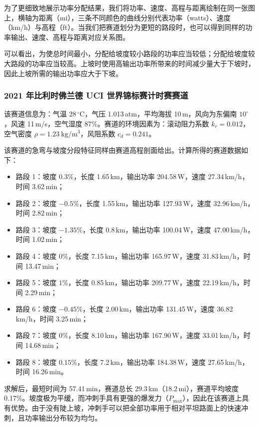 \documentclass[11pt,a4paper]{ctexart}
\begin{document}
为了更细致地展示功率分配结果，我们将功率、速度、高程与距离绘制在同一张图上，横轴为距离（mi），三条不同颜色的曲线分别代表功率（watts）、速度（km/h）与高程（ft）。当我们把赛道划分为更短的路段时，也可以得到同样的功率输出、速度、高程与距离对应关系图。

可以看出，为使总时间最小，分配给坡度较小路段的功率应当较低；分配给坡度较大路段的功率应当较高。上坡时使用高输出功率所带来的时间减少量大于下坡时，因此上坡所需的输出功率应大于下坡。

\subsubsection{2021 年比利时佛兰德 UCI 世界锦标赛计时赛赛道}

该赛道信息为：气温 $28\,^{\circ}\mathrm{C}$，气压 1.013\,atm，平均海拔 10\,m，风向为东偏南 $10^{\circ}$，风速 11\,m/s，空气湿度 87\%。赛道的环境因素为：滚动阻力系数 $k_r=0.012$，空气密度 $\rho=1.23\ \mathrm{kg/m^{3}}$，风阻系数 $c_d=0.241$。

该赛道的急弯与坡度分段特征同样由赛道高程剖面给出。计算所得的赛道数据如下：

\begin{itemize}
\item 路段 1：坡度 $0.3\%$，长度 1.65\,km，输出功率 204.58\,W，速度 27.34\,km/h，时间 3.62\,min；
\item 路段 2：坡度 $-0.5\%$，长度 1.55\,km，输出功率 127.93\,W，速度 32.96\,km/h，时间 2.82\,min；
\item 路段 3：坡度 $-1.35\%$，长度 0.8\,km，输出功率 100.04\,W，速度 47.00\,km/h，时间 1.02\,min；
\item 路段 4：坡度 $0\%$，长度 7.15\,km，输出功率 165.97\,W，速度 31.83\,km/h，时间 13.47\,min；
\item 路段 5：坡度 $1\%$，长度 0.85\,km，输出功率 209.77\,W，速度 22.19\,km/h，时间 2.29\,min；
\item 路段 6：坡度 $-0.45\%$，长度 2.00\,km，输出功率 131.45\,W，速度 36.82\,km/h，时间 3.25\,min；
\item 路段 7：坡度 $0\%$，长度 8.10\,km，输出功率 167.90\,W，速度 33.01\,km/h，时间 14.68\,min；
\item 路段 8：坡度 $0.15\%$，长度 7.2\,km，输出功率 184.38\,W，速度 27.65\,km/h，时间 16.26\,min。
\end{itemize}

求解后，最短时间为 57.41\,min，赛道总长 29.3\,km（18.2\,mi），赛道平均坡度 0.17\%。坡度极为平缓，而冲刺手具有更强的爆发力（$P_{\max}$），因此在该赛道上具有优势。由于没有陡上坡，冲刺手可以把全部功率用于相对平坦路面上的快速冲刺，且功率输出分布较为均匀。
\end{document}
